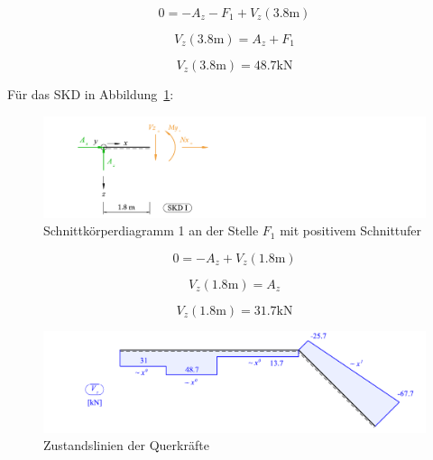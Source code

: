 \documentclass[
  12pt,
  letterpaper,
  DIV=11,
  egregdoesnotlikesansseriftitles]{scrartcl}
\begin{document}
\begin{equation}0 = - A_{z} - F_{1} + V_{z}{\left(3.8 \text{m} \right)}\end{equation}

\begin{equation}V_{z}{\left(3.8 \text{m} \right)} = A_{z} + F_{1}\end{equation}

\begin{equation}V_{z}{\left(3.8 \text{m} \right)} = 48.7 \text{k} \text{N}\end{equation}

Für das SKD in Abbildung~\ref{fig-skd_1}:

\begin{figure}[H]

{\centering \includegraphics{BSI_HS23_Testat_02_files/mediabag/../images/Testat_02_HS23_SKD_1.pdf}

}

\caption{\label{fig-skd_1}Schnittkörperdiagramm 1 an der Stelle \(F_1\)
mit positivem Schnittufer}

\end{figure}

\begin{equation}0 = - A_{z} + V_{z}{\left(1.8 \text{m} \right)}\end{equation}

\begin{equation}V_{z}{\left(1.8 \text{m} \right)} = A_{z}\end{equation}

\begin{equation}V_{z}{\left(1.8 \text{m} \right)} = 31.7 \text{k} \text{N}\end{equation}

\begin{figure}[H]

{\centering \includegraphics{BSI_HS23_Testat_02_files/mediabag/../images/Testat_02_HS23_Vz.pdf}

}

\caption{\label{fig-vz}Zustandslinien der Querkräfte}

\end{figure}
\end{document}
